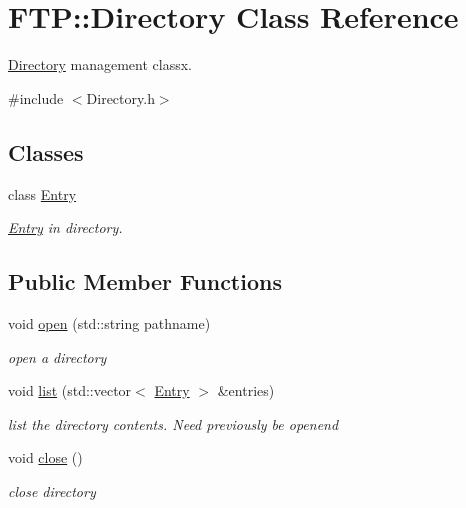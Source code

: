 \hypertarget{classFTP_1_1Directory}{}\section{F\+T\+P\+:\+:Directory Class Reference}
\label{classFTP_1_1Directory}


\hyperlink{classFTP_1_1Directory}{Directory} management classx.  




{\ttfamily \#include $<$Directory.\+h$>$}

\subsection*{Classes}
\begin{DoxyCompactItemize}
\item 
class \hyperlink{structFTP_1_1Directory_1_1Entry}{Entry}
\begin{DoxyCompactList}\small\item\em \hyperlink{structFTP_1_1Directory_1_1Entry}{Entry} in directory. \end{DoxyCompactList}\end{DoxyCompactItemize}
\subsection*{Public Member Functions}
\begin{DoxyCompactItemize}
\item 
void \hyperlink{classFTP_1_1Directory_a55f609eb353e6f9806c19e93e294ac0a}{open} (std\+::string pathname)
\begin{DoxyCompactList}\small\item\em open a directory \end{DoxyCompactList}\item 
void \hyperlink{classFTP_1_1Directory_a2030a6e209fbe90537db216839eb6c75}{list} (std\+::vector$<$ \hyperlink{structFTP_1_1Directory_1_1Entry}{Entry} $>$ \&entries)
\begin{DoxyCompactList}\small\item\em list the directory contents. Need previously be openend \end{DoxyCompactList}\item 
\hypertarget{classFTP_1_1Directory_abb5502a657390ea09207d51494213b27}{}void \hyperlink{classFTP_1_1Directory_abb5502a657390ea09207d51494213b27}{close} ()\label{classFTP_1_1Directory_abb5502a657390ea09207d51494213b27}

\begin{DoxyCompactList}\small\item\em close directory \end{DoxyCompactList}\end{DoxyCompactItemize}


